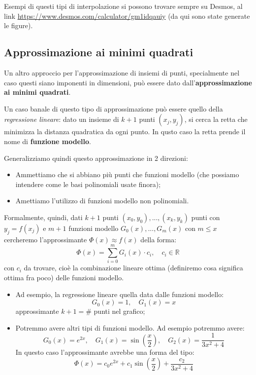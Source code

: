 \documentclass[a4paper,11pt]{article}
\begin{document}
Esempi di questi tipi di interpolazione si possono trovare sempre su Desmos, al link \url{https://www.desmos.com/calculator/gm1idqauiy} (da qui sono state generate le figure).

\subsection{Approssimazione ai minimi quadrati}
Un altro approccio per l'approssimazione di insiemi di punti, specialmente nel caso questi siano imponenti in dimensioni, può essere dato dall'\textbf{approssimazione ai minimi quadrati}.

Un caso banale di questo tipo di approssimazione può essere quello della \textit{regressione lineare}: dato un insieme di $k + 1$ punti $(x_j, y_j)$, si cerca la retta che minimizza la distanza quadratica da ogni punto.
In qusto caso la retta prende il nome di \textbf{funzione modello}.

Generalizziamo quindi questo approssimazione in 2 direzioni:
\begin{itemize}
	\item Ammettiamo che si abbiano più punti che funzioni modello (che possiamo intendere come le basi polinomiali usate finora);
	\item Amettiamo l'utilizzo di funzioni modello non polinomiali.
\end{itemize}

Formalmente, quindi, dati $k + 1$ punti $(x_0, y_0), ..., (x_k, y_k)$ punti con $y_j = f(x_j)$ e $m + 1$ funzioni modello $G_0(x), ..., G_m(x)$ con $m \leq x$ cercheremo l'approssimante $\Phi(x) \approx f(x)$ della forma:
$$
\Phi(x) = \sum_{i = 0}^m G_i(x) \cdot c_i, \quad c_i \in \mathbb{R}
$$
con $c_i$ da trovare, cioè la combinazione lineare ottima (definiremo cosa significa ottima fra poco) delle funzioni modello.

\begin{itemize}
	\item 
		Ad esempio, la regressione lineare quella data dalle funzioni modello:
		$$
		G_0(x) = 1, \quad G_1(x) = x
		$$
		approssimante $k + 1 = \#$ punti nel grafico;
	\item Potremmo avere altri tipi di funzioni modello.
		Ad esempio potremmo avere:
		$$
		G_0(x) = e^{2x}, \quad G_1(x) = \sin\left( \frac{x}{2} \right), \quad G_2(x) = \frac{1}{3x^2 + 4}
		$$
		In questo caso l'approssimante avrebbe una forma del tipo:
		$$
		\Phi(x) = c_0 e^{2x} + c_1 \sin \left( \frac{x}{2} \right) + \frac{c_2}{3x^2 + 4}
		$$
\end{itemize}
\end{document}
